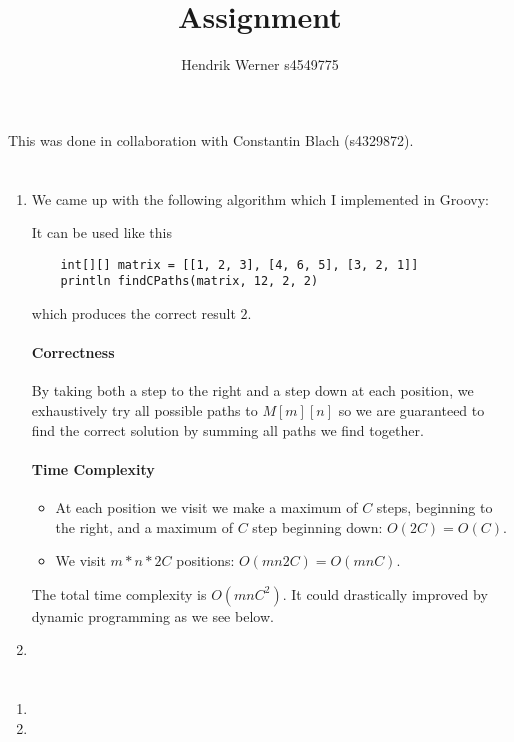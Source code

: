 \documentclass[12pt, a4paper]{article}
\title{Assignment}
\author{Hendrik Werner s4549775}
\begin{document}
\maketitle

This was done in collaboration with Constantin Blach (s4329872).

\section{} %

\section{} %
\begin{enumerate}[a]
	\item %
	We came up with the following algorithm which I implemented in Groovy:

	

	It can be used like this

	\begin{lstlisting}
	int[][] matrix = [[1, 2, 3], [4, 6, 5], [3, 2, 1]]
	println findCPaths(matrix, 12, 2, 2)
	\end{lstlisting}

	which produces the correct result $2$.

	\paragraph{Correctness}

	By taking both a step to the right and a step down at each position, we exhaustively try all possible paths to $M[m][n]$ so we are guaranteed to find the correct solution by summing all paths we find together.

	\paragraph{Time Complexity}

	\begin{itemize}
		\item At each position we visit we make a maximum of $C$ steps, beginning to the right, and a maximum of $C$ step beginning down: $O(2C) = O(C)$.
		\item We visit $m * n * 2C$ positions: $O(mn2C) = O(mnC)$.
	\end{itemize}

	The total time complexity is $O(mnC^2)$. It could drastically improved by dynamic programming as we see below.

	\item %
\end{enumerate}

\section{} %
\begin{enumerate}[a]
	\item %
	\item %
\end{enumerate}
\end{document}

